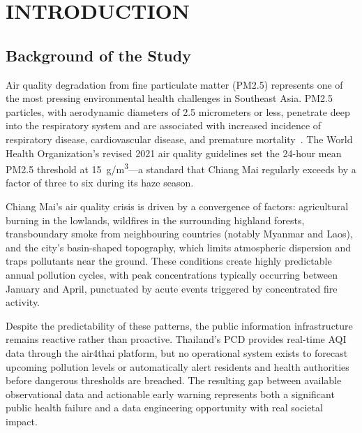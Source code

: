 \documentclass[12pt,a4paper]{report}
\begin{document}
\newpage


\chapter{INTRODUCTION}

\section{Background of the Study}

Air quality degradation from fine particulate matter (PM2.5) represents one of the most pressing environmental health challenges in Southeast Asia. PM2.5 particles, with aerodynamic diameters of 2.5 micrometers or less, penetrate deep into the respiratory system and are associated with increased incidence of respiratory disease, cardiovascular disease, and premature mortality~\cite{who2021}. The World Health Organization's revised 2021 air quality guidelines set the 24-hour mean PM2.5 threshold at 15~\textmu g/m\textsuperscript{3}---a standard that Chiang Mai regularly exceeds by a factor of three to six during its haze season.

Chiang Mai's air quality crisis is driven by a convergence of factors: agricultural burning in the lowlands, wildfires in the surrounding highland forests, transboundary smoke from neighbouring countries (notably Myanmar and Laos), and the city's basin-shaped topography, which limits atmospheric dispersion and traps pollutants near the ground. These conditions create highly predictable annual pollution cycles, with peak concentrations typically occurring between January and April, punctuated by acute events triggered by concentrated fire activity.

Despite the predictability of these patterns, the public information infrastructure remains reactive rather than proactive. Thailand's PCD provides real-time AQI data through the air4thai platform, but no operational system exists to forecast upcoming pollution levels or automatically alert residents and health authorities before dangerous thresholds are breached. The resulting gap between available observational data and actionable early warning represents both a significant public health failure and a data engineering opportunity with real societal impact.
\end{document}
